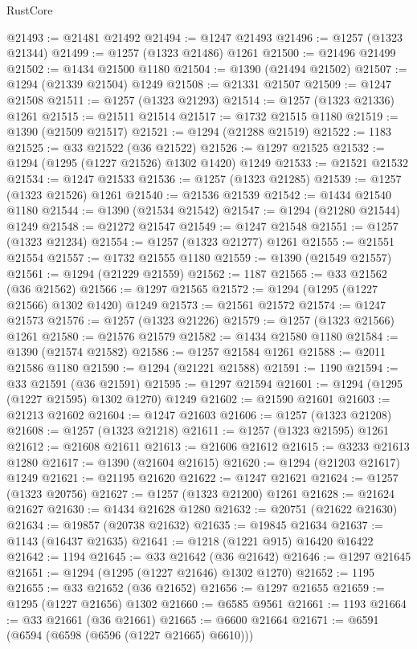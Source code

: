 \begin{lexlean}{RustCore}
\begin{coremodule}
@21493 := @21481 @21492
@21494 := @1247 @21493
@21496 := @1257 (@1323 @21344)
@21499 := @1257 (@1323 @21486) @1261
@21500 := @21496 @21499
@21502 := @1434 @21500 @1180
@21504 := @1390 (@21494 @21502)
@21507 := @1294 (@21339 @21504) @1249
@21508 := @21331 @21507
@21509 := @1247 @21508
@21511 := @1257 (@1323 @21293)
@21514 := @1257 (@1323 @21336) @1261
@21515 := @21511 @21514
@21517 := @1732 @21515 @1180
@21519 := @1390 (@21509 @21517)
@21521 := @1294 (@21288 @21519)
@21522 := 1183
@21525 := @33 @21522 (@36 @21522)
@21526 := @1297 @21525
@21532 := @1294 (@1295 (@1227 @21526) @1302 @1420) @1249
@21533 := @21521 @21532
@21534 := @1247 @21533
@21536 := @1257 (@1323 @21285)
@21539 := @1257 (@1323 @21526) @1261
@21540 := @21536 @21539
@21542 := @1434 @21540 @1180
@21544 := @1390 (@21534 @21542)
@21547 := @1294 (@21280 @21544) @1249
@21548 := @21272 @21547
@21549 := @1247 @21548
@21551 := @1257 (@1323 @21234)
@21554 := @1257 (@1323 @21277) @1261
@21555 := @21551 @21554
@21557 := @1732 @21555 @1180
@21559 := @1390 (@21549 @21557)
@21561 := @1294 (@21229 @21559)
@21562 := 1187
@21565 := @33 @21562 (@36 @21562)
@21566 := @1297 @21565
@21572 := @1294 (@1295 (@1227 @21566) @1302 @1420) @1249
@21573 := @21561 @21572
@21574 := @1247 @21573
@21576 := @1257 (@1323 @21226)
@21579 := @1257 (@1323 @21566) @1261
@21580 := @21576 @21579
@21582 := @1434 @21580 @1180
@21584 := @1390 (@21574 @21582)
@21586 := @1257 @21584 @1261
@21588 := @2011 @21586 @1180
@21590 := @1294 (@21221 @21588)
@21591 := 1190
@21594 := @33 @21591 (@36 @21591)
@21595 := @1297 @21594
@21601 := @1294 (@1295 (@1227 @21595) @1302 @1270) @1249
@21602 := @21590 @21601
@21603 := @21213 @21602
@21604 := @1247 @21603
@21606 := @1257 (@1323 @21208)
@21608 := @1257 (@1323 @21218)
@21611 := @1257 (@1323 @21595) @1261
@21612 := @21608 @21611
@21613 := @21606 @21612
@21615 := @3233 @21613 @1280
@21617 := @1390 (@21604 @21615)
@21620 := @1294 (@21203 @21617) @1249
@21621 := @21195 @21620
@21622 := @1247 @21621
@21624 := @1257 (@1323 @20756)
@21627 := @1257 (@1323 @21200) @1261
@21628 := @21624 @21627
@21630 := @1434 @21628 @1280
@21632 := @20751 (@21622 @21630)
@21634 := @19857 (@20738 @21632)
@21635 := @19845 @21634
@21637 := @1143 (@16437 @21635)
@21641 := @1218 (@1221 @915) @16420 @16422
@21642 := 1194
@21645 := @33 @21642 (@36 @21642)
@21646 := @1297 @21645
@21651 := @1294 (@1295 (@1227 @21646) @1302 @1270)
@21652 := 1195
@21655 := @33 @21652 (@36 @21652)
@21656 := @1297 @21655
@21659 := @1295 (@1227 @21656) @1302
@21660 := @6585 @9561
@21661 := 1193
@21664 := @33 @21661 (@36 @21661)
@21665 := @6600 @21664
@21671 := @6591 (@6594 (@6598 (@6596 (@1227 @21665) @6610)))

\end{coremodule}
\end{lexlean}
